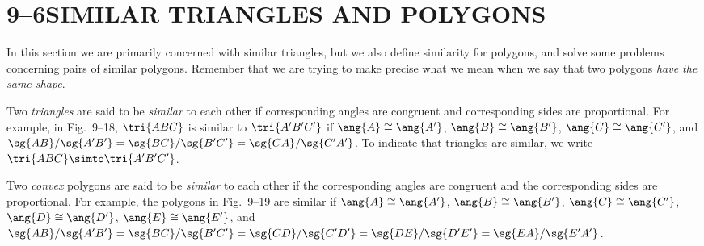 \documentclass[11pt]{book}
\theoremstyle{bkplain}
\theoremstyle{XIplainnote}
\theoremstyle{bkplain}
\theoremstyle{bkplain}
\begin{document}
\section*{9--6\quad SIMILAR TRIANGLES AND POLYGONS}

In this section we are primarily concerned with similar triangles, but we also
define similarity for polygons, and solve some problems concerning pairs of
similar polygons. Remember that we are trying to make precise what we mean when
we say that two polygons \emph{have the same shape}.

\begin{definition}
Two \emph{triangles} are said to be \emph{similar} to each other if corresponding
angles are congruent and corresponding sides are proportional. For example, in
Fig.~9--18, $\tri{ABC}$ is similar to $\tri{A'B'C'}$ if $\ang{A} \cong \ang{A'}$,
$\ang{B} \cong \ang{B'}$, $\ang{C} \cong \ang{C'}$, and $\sg{AB}/\sg{A'B'} =
\sg{BC}/\sg{B'C'} = \sg{CA}/\sg{C'A'}$. To indicate that triangles are similar,
we write $\tri{ABC} \simto \tri{A'B'C'}$.
\end{definition}

Two \emph{convex} polygons are said to be \emph{similar} to each other if the
corresponding angles are congruent and the corresponding sides are proportional.
For example, the polygons in Fig.~9--19 are similar if $\ang{A} \cong \ang{A'}$,
$\ang{B} \cong \ang{B'}$, $\ang{C} \cong \ang{C'}$, $\ang{D} \cong \ang{D'}$,
$\ang{E} \cong \ang{E'}$, and $\sg{AB}/\sg{A'B'} = \sg{BC}/\sg{B'C'} =
\sg{CD}/\sg{C'D'} = \sg{DE}/\sg{D'E'} = \sg{EA}/\sg{E'A'}$.

\FIGIXEIGHTEENNINETEEN
\end{document}
